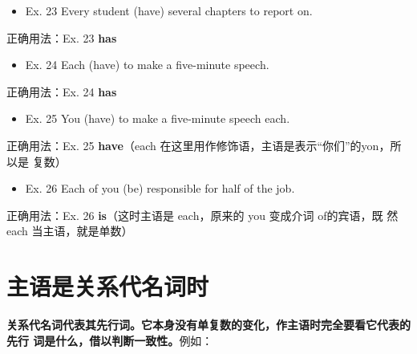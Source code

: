 \begin{mybox}
  \begin{itemize}
  \item   Ex. 23 Every student (have) several chapters to report on.
  \end{itemize}

  \tcblower

  正确用法：Ex. 23 \textbf{has}
\end{mybox}

\begin{mybox}

  \begin{itemize}
  \item   Ex. 24 Each (have) to make a five-minute speech.
  \end{itemize}

  \tcblower

  正确用法：Ex. 24 \textbf{has}
\end{mybox}

\begin{mybox}

  \begin{itemize}
  \item   Ex. 25 You (have) to make a five-minute speech each.
  \end{itemize}

  \tcblower

  正确用法：Ex. 25 \textbf{have}（each 在这里用作修饰语，主语是表示“你们”的yon，所以是
  复数）
\end{mybox}

\begin{mybox}

  \begin{itemize}
  \item   Ex. 26 Each of you (be) responsible for half of the job.
  \end{itemize}

  \tcblower

  正确用法：Ex. 26 \textbf{is}（这时主语是 each，原来的 you 变成介词 of的宾语，既
  然 each 当主语，就是单数）
\end{mybox}

\section{主语是关系代名词时}

\textbf{关系代名词代表其先行词。它本身没有单复数的变化，作主语时完全要看它代表的先行
  词是什么，借以判断一致性。}例如：

